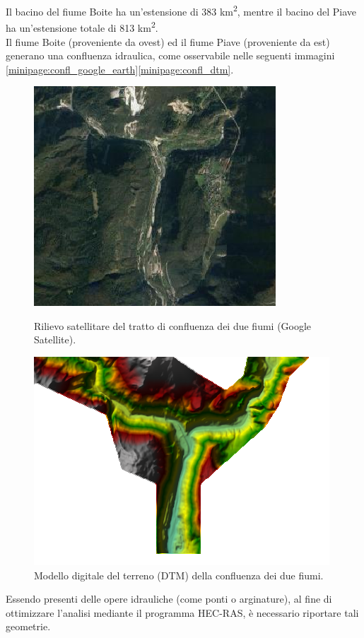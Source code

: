 Il bacino del fiume Boite ha un'estensione di 383 \unit{km^2}, mentre il bacino del Piave ha un'estensione totale di 813 \unit{km^2}.\\
Il fiume Boite (proveniente da ovest) ed il fiume Piave (proveniente da est) generano una confluenza idraulica, come osservabile nelle seguenti immagini \eqref{minipage:confl_google_earth}\eqref{minipage:confl_dtm}.

\begin{figure}[H] \centering
    \begin{minipage}[]{7cm}
\includegraphics[scale=0.80]{immagini/confl_google_earth.PNG}
\caption{Rilievo satellitare del tratto di confluenza dei due fiumi (Google Satellite).}
\label{minipage:confl_google_earth}    
    \end{minipage}
        \hspace{2cm}
    \begin{minipage}[]{7cm}
        \includegraphics[scale=0.90]{immagini/confl_dtm.PNG}
        \caption{Modello digitale del terreno (DTM) della confluenza dei due fiumi.}
    \label{minipage:confl_dtm}
    \end{minipage} 
        \end{figure}
Essendo presenti delle opere idrauliche (come ponti o arginature), al fine di ottimizzare l'analisi mediante il programma HEC-RAS, è necessario riportare tali geometrie.

